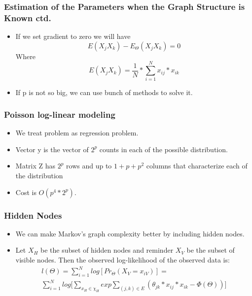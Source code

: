 \documentclass{beamer}
\begin{document}
\begin{frame}
\frametitle{ Estimation of the Parameters when the Graph Structure is Known ctd.}
\begin{itemize}
\item If we set gradient to zero we will have 
\begin{equation}
E( X_jX_k ) − E_{\Theta}(X_jX_k) = 0
\end{equation}
Where 
\begin{equation}
E( X_jX_k )= \frac{1}{N} * \sum_{i=1}^N x_{ij} * x_{ik} 
\end{equation}
\item If p is not so big, we can use bunch of methods to solve it.
\end{itemize}
\end{frame}

\begin{frame}
\frametitle{ Poisson log-linear modeling}
\begin{itemize}
\item We treat problem as regression problem.
\item Vector y is the vector of $2^p$ counts in each of the possible distribution.
\item Matrix Z has $2^p$ rows and up to $1+p+p^2$ columns that characterize each of the distribution
\item Cost is $O(p^4 * 2^p)$. 
\end{itemize}
\end{frame}

\begin{frame}
\frametitle{ Hidden Nodes}
\begin{itemize}
\item We can make Markov's graph complexity better by including hidden nodes.
\item Let $X_H$ be the subset of hidden nodes and reminder $X_V$ be the subset of visible nodes. Then the observed log-likelihood of the observed data is:
\begin{align*}
l(\Theta) = \sum_{i=1}^N log[Pr_{\Theta}(X_V = x_{iV})] = \\ \sum_{i=1}^N log\Big[\sum_{x_H \in \chi_H} exp \sum_{(j, k) \in E} (\theta_{jk} * x_{ij} * x_{ik} - \Phi(\Theta))\Big]
\end{align*}
\end{itemize}
\end{frame}
\end{document}
